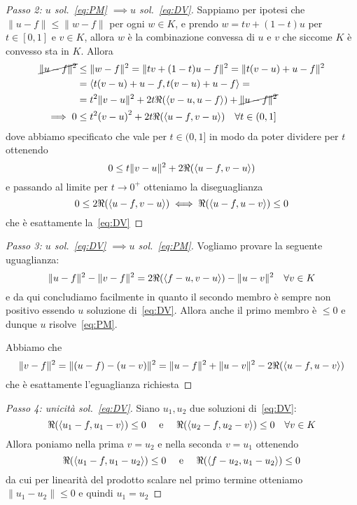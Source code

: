 \begin{proof}[Passo 2: \(u\) sol.~\eqref{eq:PM} \(\implies u \) sol.~\eqref{eq:DV}]
    Sappiamo per ipotesi che \(\|u -f\| \le \|w - f\|\) per ogni \(w \in K\), e
    prendo \(w = tv + {(1-t)}u\) per \(t \in [0, 1]\) e \(v \in K\), allora
    \(w\) è la combinazione convessa di \(u\) e \(v\) che siccome \(K\) è
    convesso sta in \(K\). Allora
    \begin{align*}
        \cancel{\|u -f\|^2} &\le \|w - f\|^2 = \|tv + {(1-t)}u - f\|^2 = \|t{(v- u)} + u -
        f\|^2 \\ &= {\left\langle t(v-u) + u - f, t(v-u) + u - f\right\rangle} = \\ &= t^2\|v-u\|^2 +
        2t\Re({\left\langle v-u, u-f\right\rangle}) + \cancel{\|u-f\|^2} \\
        \implies 0 &\le t^2{(v-u)}^2 + 2t \Re{({\left\langle u - f, v-u\right\rangle} )} \quad \forall
        t \in (0, 1]
    \end{align*}
    dove abbiamo specificato che vale per \(t \in (0, 1]\) in modo da poter
    dividere per \(t\) ottenendo
    \[
        0 \le t\|v-u\|^2 + 2\Re({\left\langle u-f, v-u\right\rangle})
    \]
    e passando al limite per \(t \to 0^{+}\) otteniamo la diseguaglianza
    \[
        0 \le 2\Re {({\left\langle u -f, v-u\right\rangle} )} \iff \Re{({\left\langle u-f, u - v\right\rangle})} \le 0
    \]
    che è esattamente la~\eqref{eq:DV}
\end{proof}
\begin{proof}[Passo 3: \(u\) sol.~\eqref{eq:DV} \(\implies u\) sol.~\eqref{eq:PM}]
    Vogliamo provare la seguente uguaglianza:
    \[
      \|u-f\|^2 - \|v-f\|^2 = 2\Re{({\left\langle f-u, v-u\right\rangle} )} - \|u-v\|^2 \quad \forall
      v \in K
    \]
    e da qui concludiamo facilmente in quanto il secondo membro è sempre non
    positivo essendo \(u\) soluzione di~\eqref{eq:DV}. Allora anche il primo
    membro è \(\le 0\) e dunque \(u\) risolve~\eqref{eq:PM}.

    Abbiamo che
    \begin{equation*}
        \|v-f\|^2 = \|(u-f) - (u-v)\|^2 = \|u-f\|^2 + \|u-v\|^2 -
        2\Re{({\left\langle u-f, u-v\right\rangle} )}
    \end{equation*}
    che è esattamente l'eguaglianza richiesta
\end{proof}
\begin{proof}[Passo 4: unicità sol.~\eqref{eq:DV}]
    Siano \(u_{1}, u_{2}\) due soluzioni di~\eqref{eq:DV}:
    \[
      \Re{({\left\langle u_{1} - f, u_{1} - v\right\rangle})} \le 0 \quad \text{ e } \quad
      \Re{({\left\langle u_{2} - f, u_{2} - v\right\rangle})} \le 0 \quad \forall v \in K
    \]
    Allora poniamo nella prima \(v = u_{2}\) e nella seconda \(v = u_{1}\)
    ottenendo 
    \[
      \Re({\left\langle u_{1} - f, u_{1} - u_{2}\right\rangle}) \le 0 \quad \text{ e } \quad
      \Re({\left\langle f - u_{2}, u_{1} - u_{2}\right\rangle}) \le 0
    \]
    da cui per linearità del prodotto scalare nel primo termine
    otteniamo \(\|u_{1} - u_{2}\| \le 0\) e quindi \(u_{1} = u_{2}\) 
\end{proof}
